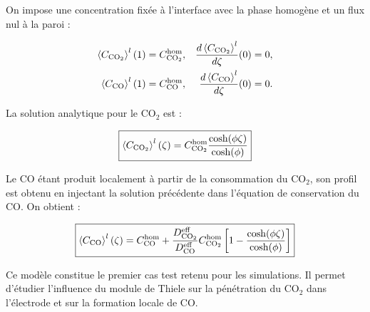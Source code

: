 On impose une concentration fixée à l'interface avec la phase homogène et un flux
nul à la paroi :

\begin{align}
\left\langle C_{\ce{CO2}}\right\rangle^l(1) &= C_{\ce{CO2}}^{\mathrm{hom}},
&
\frac{d \left\langle C_{\ce{CO2}}\right\rangle^l}{d\zeta}(0) &= 0,\\
\left\langle C_{\ce{CO}}\right\rangle^l(1) &= C_{\ce{CO}}^{\mathrm{hom}},
&
\frac{d \left\langle C_{\ce{CO}}\right\rangle^l}{d\zeta}(0) &= 0.
\end{align}

La solution analytique pour le CO$_2$ est :

\begin{equation}
\boxed{
\left\langle C_{\ce{CO2}}\right\rangle^l(\zeta)
=
C_{\ce{CO2}}^{\mathrm{hom}}
\frac{
\cosh(\phi\zeta)
}
{\cosh(\phi)}
}
\end{equation}

Le CO étant produit localement à partir de la consommation du CO$_2$,
son profil est obtenu en injectant la solution précédente dans l'équation
de conservation du CO. On obtient :

\begin{equation}
\boxed{
\left\langle C_{\ce{CO}}\right\rangle^l(\zeta)
=
C_{\ce{CO}}^{\mathrm{hom}}
+
\frac{D_{\ce{CO2}}^{\mathrm{eff}}}
     {D_{\ce{CO}}^{\mathrm{eff}}}
C_{\ce{CO2}}^{\mathrm{hom}}
\left[
1-
\frac{
\cosh(\phi\zeta)
}
{\cosh(\phi)}
\right]
}
\end{equation}

Ce modèle constitue le premier cas test retenu pour les simulations.
Il permet d'étudier l'influence du module de Thiele sur la pénétration
du CO$_2$ dans l'électrode et sur la formation locale de CO.
